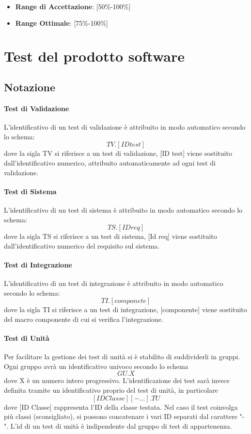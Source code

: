 \documentclass[12pt,a4paper]{article}
\begin{document}
	\begin{itemize}
		\item \textbf{Range di Accettazione}: [50\%-100\%]
		\item \textbf{Range Ottimale}: [75\%-100\%]
	\end{itemize}
	
	\newpage
	
	\section{Test del prodotto software}\label{test}
	\subsection{Notazione}
	\paragraph{Test di Validazione}
	L'identificativo di un test di validazione è attribuito in modo automatico secondo lo schema:
	\[ TV.[ID test ]\]
	dove la sigla TV si riferisce a un test di validazione, [ID test] viene sostituito dall'identificativo numerico, attribuito automaticamente ad ogni test di validazione.
		
	\paragraph{Test di Sistema}
	L'identificativo di un test di sistema è attribuito in modo automatico secondo lo schema:
	\[ TS.[ID req]\]
	dove la sigla TS si riferisce a un test di sistema, [Id req] viene sostituito dall'identificativo numerico del requisito sul sistema.
	 
	\paragraph{Test di Integrazione}
	L'identificativo di un test di integrazione è attribuito in modo automatico secondo lo schema:
	\[ TI.[componete]\]
	dove la sigla TI si riferisce a un test di integrazione, [componente] viene sostituito del macro componente di cui si verifica l'integrazione.
	
	\paragraph{Test di Unità}
	Per facilitare la gestione dei test di unità si è stabilito di suddividerli in gruppi. Ogni gruppo avrà un identificativo univoco secondo lo schema	
	\[ GU.X  \]
	dove X è un numero intero progressivo. L'identificazione dei test sarà invece definita tramite un identificativo proprio del test di unità, in particolare
	\[ [ID Classe][- ...].TU \] 
	dove [ID Classe] rappresenta l'ID della classe testata. Nel caso il test coinvolga più classi (sconsigliato), si possono concatenare i vari ID separati dal carattere "-". L'id di un test di unità è indipendente dal gruppo di test di appartenenza.
	
\end{document}
